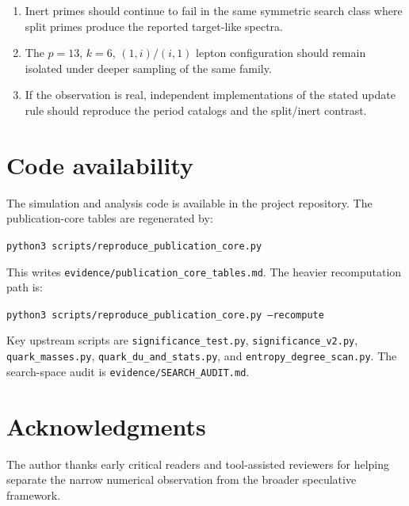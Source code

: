 \documentclass[11pt,a4paper]{article}
\begin{document}
\begin{enumerate}
\item Inert primes should continue to fail in the same symmetric search class where split primes produce the reported target-like spectra.
\item The $p=13$, $k=6$, $(1,i)/(i,1)$ lepton configuration should remain isolated under deeper sampling of the same family.
\item If the observation is real, independent implementations of the stated update rule should reproduce the period catalogs and the split/inert contrast.
\end{enumerate}

\section{Code availability}

The simulation and analysis code is available in the project repository. The publication-core tables are regenerated by:

\begin{center}
\texttt{python3 scripts/reproduce\_publication\_core.py}
\end{center}

This writes \texttt{evidence/publication\_core\_tables.md}. The heavier recomputation path is:

\begin{center}
\texttt{python3 scripts/reproduce\_publication\_core.py --recompute}
\end{center}

Key upstream scripts are \texttt{significance\_test.py}, \texttt{significance\_v2.py}, \texttt{quark\_masses.py}, \texttt{quark\_du\_and\_stats.py}, and \texttt{entropy\_degree\_scan.py}. The search-space audit is \texttt{evidence/SEARCH\_AUDIT.md}.

\section*{Acknowledgments}

The author thanks early critical readers and tool-assisted reviewers for helping separate the narrow numerical observation from the broader speculative framework.
\end{document}
